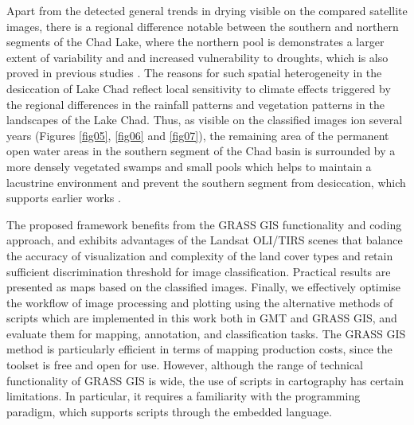\documentclass[geosciences,article,submit,pdftex,moreauthors]{Definitions/mdpi}
\begin{document}
Apart from the detected general trends in drying visible on the compared satellite images, there is a regional difference notable between the southern and northern segments of the Chad Lake, where the northern pool is demonstrates a larger extent of variability and and increased vulnerability to droughts, which is also proved in previous studies \cite{LEMOALLE2012247}. The reasons for such spatial heterogeneity in the desiccation of Lake Chad reflect local sensitivity to climate effects triggered by the regional differences in the rainfall patterns and vegetation patterns in the landscapes of the Lake Chad. Thus, as visible on the classified images ion several years (Figures \ref{fig05}, \ref{fig06} and \ref{fig07}), the remaining area of the permanent open water areas in the southern segment of the Chad basin is surrounded by a more densely vegetated swamps and small pools which helps to maintain a lacustrine environment and prevent the southern segment from desiccation, which supports earlier works \cite{Lauwaet}.

The proposed framework benefits from the GRASS GIS functionality and coding approach, and exhibits advantages of the Landsat OLI/TIRS scenes that balance the accuracy of visualization and complexity of the land cover types and retain sufficient discrimination threshold for image classification. Practical results are presented as maps based on the classified images. Finally, we effectively optimise the workflow of image processing and plotting using the alternative methods of scripts which are implemented in this work both in GMT and GRASS GIS, and evaluate them for mapping, annotation, and classification tasks. The GRASS GIS method is particularly efficient in terms of mapping production costs, since the toolset is free and open for use. However, although the range of technical functionality of GRASS GIS is wide, the use of scripts in cartography has certain limitations. In particular, it requires a familiarity with the programming paradigm, which supports scripts through the embedded language. 
\end{document}
